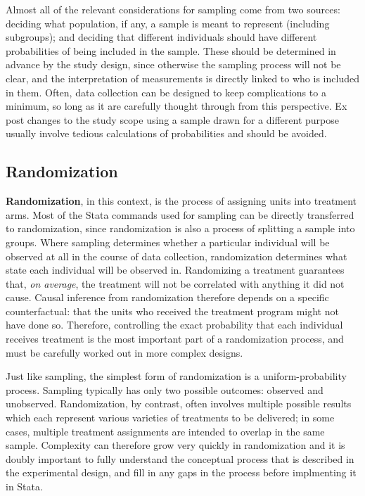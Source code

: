 Almost all of the relevant considerations for sampling come from two sources:
deciding what population, if any, a sample is meant to represent (including subgroups);
and deciding that different individuals should have different probabilities
of being included in the sample.
These should be determined in advance by the study design,
since otherwise the sampling process will not be clear,
and the interpretation of measurements is directly linked to who is included in them.
Often, data collection can be designed to keep complications to a minimum,
so long as it are carefully thought through from this perspective.
Ex post changes to the study scope using a sample drawn for a different purpose
usually involve tedious calculations of probabilities and should be avoided.

\subsection{Randomization}

\textbf{Randomization}, in this context, is the process of assigning units into treatment arms.
Most of the Stata commands used for sampling can be directly transferred to randomization,
since randomization is also a process of splitting a sample into groups.
Where sampling determines whether a particular individual
will be observed at all in the course of data collection,
randomization determines what state each individual will be observed in.
Randomizing a treatment guarantees that, \textit{on average},
the treatment will not be correlated with anything it did not cause.\cite{duflo2007using}
Causal inference from randomization therefore depends on a specific counterfactual:
that the units who received the treatment program might not have done so.
Therefore, controlling the exact probability that each individual receives treatment
is the most important part of a randomization process,
and must be carefully worked out in more complex designs.

Just like sampling, the simplest form of randomization is a uniform-probability process.
Sampling typically has only two possible outcomes: observed and unobserved.
Randomization, by contrast, often involves multiple possible results
which each represent various varieties of treatments to be delivered;
in some cases, multiple treatment assignments are intended to overlap in the same sample.
Complexity can therefore grow very quickly in randomization
and it is doubly important to fully understand the conceptual process
that is described in the experimental design,
and fill in any gaps in the process before implmenting it in Stata.

